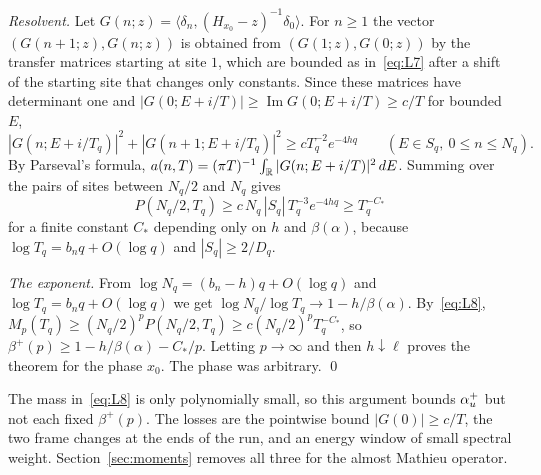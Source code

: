 \emph{Resolvent.} Let $G(n;z)=\langle\delta_n,(H_{x_0}-z)^{-1}\delta_0\rangle$. For $n\ge1$ the vector $(G(n+1;z),G(n;z))$ is obtained from $(G(1;z),G(0;z))$ by the transfer matrices starting at site $1$, which are bounded as in~\eqref{eq:L7} after a shift of the starting site that changes only constants. Since these matrices have determinant one and $|G(0;E+i/T)|\ge\operatorname{Im}G(0;E+i/T)\ge c/T$ for bounded $E$,
\[
|G(n;E+i/T_q)|^2+|G(n+1;E+i/T_q)|^2\ge cT_q^{-2}e^{-4hq}\qquad(E\in S_q,\ 0\le n\le N_q).
\]
By Parseval's formula, $a(n,T)=(\pi T)^{-1}\int_\mathbb R|G(n;E+i/T)|^2\,dE$. Summing over the pairs of sites between $N_q/2$ and $N_q$ gives
\begin{equation}\label{eq:L8}
P(N_q/2,T_q)\ge c\,N_q\,|S_q|\,T_q^{-3}e^{-4hq}\ge T_q^{-C_*}
\end{equation}
for a finite constant $C_*$ depending only on $h$ and $\beta(\alpha)$, because $\log T_q=b_nq+O(\log q)$ and $|S_q|\ge2/D_q$.

\emph{The exponent.} From $\log N_q=(b_n-h)q+O(\log q)$ and $\log T_q=b_nq+O(\log q)$ we get $\log N_q/\log T_q\to1-h/\beta(\alpha)$. By~\eqref{eq:L8}, $M_p(T_q)\ge(N_q/2)^pP(N_q/2,T_q)\ge c(N_q/2)^pT_q^{-C_*}$, so $\beta^+(p)\ge1-h/\beta(\alpha)-C_*/p$. Letting $p\to\infty$ and then $h\downarrow\ell$ proves the theorem for the phase $x_0$. The phase was arbitrary.
\qed

The mass in~\eqref{eq:L8} is only polynomially small, so this argument bounds $\alpha_u^+$ but not each fixed $\beta^+(p)$. The losses are the pointwise bound $|G(0)|\ge c/T$, the two frame changes at the ends of the run, and an energy window of small spectral weight. Section~\ref{sec:moments} removes all three for the almost Mathieu operator.
